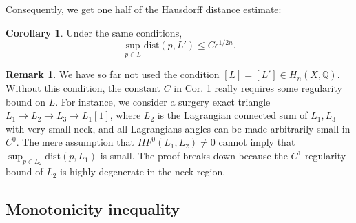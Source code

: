 \documentclass[a4paper]{article}
\theoremstyle{definition}
\newtheorem{cor}[thm]{Corollary}
\newtheorem{rmk}{Remark}
\newcommand{\Q}{\mathbb{Q}}
\begin{document}










Consequently, we get one half of the Hausdorff distance estimate:


\begin{cor}\label{HalfHausdorff}
Under the same conditions,
\begin{equation}
\sup_{p\in L} \text{dist}(p,L') \leq C\epsilon^{1/2n}.
\end{equation}
\end{cor}





\begin{rmk}\label{C2regularity}
We have so far not used the condition $[L]=[L']\in H_n(X,\Q)$. Without this condition, the constant $C$ in Cor. \ref{HalfHausdorff} really requires some regularity bound on $L$. For instance, we consider a surgery exact triangle $L_1\to L_2\to L_3\to L_1[1]$, where $L_2$ is the Lagrangian connected sum of $L_1, L_3$ with very small neck, and all Lagrangians angles can be made arbitrarily small in $C^0$. The mere assumption that $HF^0(L_1,L_2)\neq 0$ cannot imply that $\sup_{p\in L_2} \text{dist}(p,L_1)$ is small. The proof breaks down because the $C^1$-regularity bound of $L_2$ is highly degenerate in the neck region.
\end{rmk}

















\subsection{Monotonicity inequality}
\end{document}
